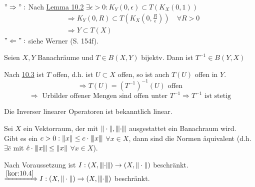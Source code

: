 \begin{beweis}
	$"\Rightarrow":$ Nach \hyperref[lemma:10.2]{Lemma 10.2} $\exists \epsilon > 0: K_{Y}(0, \epsilon) \subset T(K_{X}(0, 1)) $
	\begin{align*}
		& \Rightarrow K_{Y}(0, R) \subset T(K_{X}(0, \frac{R}{\epsilon})) \quad \forall R > 0 \\
		& \Rightarrow Y \subset T(X)
	\end{align*}
	$"\Leftarrow":$ siehe Werner (S. 154f). %
\end{beweis}


\begin{kor} \label{kor:10.4}
	Seien $X, Y$ Banachräume und $T \in B(X, Y)$ bijektv. Dann ist $T^{-1} \in B(Y, X)$	
\end{kor}

\begin{beweis}
	Nach \hyperref[satz:10.3-offeneAbbildung]{10.3} ist $T$ offen, d.h. ist $U \subset X$ offen, so ist auch $T(U)$ offen in $Y$. \\
	\[ \Rightarrow T(U) = \left( T^{-1} \right)^{-1}(U) \text{ offen} \]
	\[ \Rightarrow \text{ Urbilder offener Mengen sind offen unter } T^{-1} \Rightarrow T^{-1} \text{ ist stetig} \] 
	
	Die Inverser linearer Operatoren ist bekanntlich linear.	
\end{beweis}


\begin{kor} \label{kor:10.5}
	Sei $X$	ein Vektorraum, der mit $\| \cdot \|, {\left\vert\kern-0.25ex\left\vert\kern-0.25ex\left\vert\cdot\right\vert\kern-0.25ex\right\vert\kern-0.25ex\right\vert}$ ausgestattet ein Banachraum wird. \\
	Gibt es ein $c > 0: \| x \| \leq c \cdot {\left\vert\kern-0.25ex\left\vert\kern-0.25ex\left\vert x\right\vert\kern-0.25ex\right\vert\kern-0.25ex\right\vert}$ $\forall x \in X$, dann sind die Normen äquivalent (d.h. $\exists \hat{c} $ mit $\hat{c} \cdot {\left\vert\kern-0.25ex\left\vert\kern-0.25ex\left\vert x\right\vert\kern-0.25ex\right\vert\kern-0.25ex\right\vert} \leq \| x \|$ $\forall x \in X$). 
\end{kor}

\begin{beweis}
	Nach Voraussetzung ist $I : (X, {\left\vert\kern-0.25ex\left\vert\kern-0.25ex\left\vert\cdot\right\vert\kern-0.25ex\right\vert\kern-0.25ex\right\vert}) \rightarrow (X, \| \cdot \|)$ beschränkt. \\
	$\xRightarrow[]{\ref{kor:10.4}} I : (X, \| \cdot \|) \rightarrow (X, {\left\vert\kern-0.25ex\left\vert\kern-0.25ex\left\vert\cdot\right\vert\kern-0.25ex\right\vert\kern-0.25ex\right\vert})$ beschränkt.
\end{beweis}



\newpage